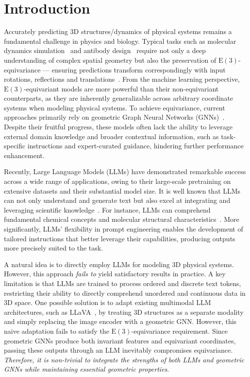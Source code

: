\section{Introduction}

Accurately predicting 3D structures/dynamics of physical systems remains a fundamental challenge in physics and biology. Typical tasks such as molecular dynamics simulation~\citep{hollingsworth2018molecular} and antibody design~\citep{tiller2015advances} require not only a deep understanding of complex spatial geometry but also the preservation of $\mathrm{E}(3)$-equivariance --- ensuring predictions transform correspondingly with input rotations, reflections and translations~\citep{batzner20223, huang2022equivariant}. From the machine learning perspective, $\mathrm{E}(3)$-equivariant models are more powerful than their non-equivariant counterparts, as they are inherently generalizable across arbitrary coordinate systems when modeling physical systems. To achieve equivariance, current approaches primarily rely on geometric Graph Neural Networks (GNNs)~\citep{wu2024equivariant, kong2022conditional}. Despite their fruitful progress, these models often lack the ability to leverage external domain knowledge and broader contextual information, such as task-specific instructions and expert-curated guidance, hindering further performance enhancement.

Recently, Large Language Models (LLMs) have demonstrated remarkable success across a wide range of applications, owing to their large-scale pretraining on extensive datasets and their substantial model size. It is well known that LLMs can not only understand and generate text but also excel at integrating and leveraging scientific knowledge~\citep{liu2025integrating, jablonka2024leveraging, wang2023scibench}. For instance, LLMs can comprehend fundamental chemical concepts and molecular structural characteristics~\citep{guo2023can}. More significantly, LLMs' flexibility in prompt engineering enables the development of tailored instructions that better leverage their capabilities, producing outputs more precisely suited to the task.

A natural idea is to directly employ LLMs for modeling 3D physical systems. However, this approach \emph{fails to} yield satisfactory results in practice. A key limitation is that LLMs are trained to process ordered and discrete text tokens, restricting their ability to directly comprehend unordered and continuous data in 3D space. One possible solution is to adapt existing multimodal LLM architectures, such as LLaVA~\citep{liu2024visual}, by treating 3D structures as a separate modality and simply replacing the image encoder with a geometric GNN. However, this naive adaptation fails to satisfy the $\mathrm{E}(3)$-equivariance requirement. Since geometric GNNs produce both invariant features and equivariant coordinates, passing these outputs through an LLM inevitably compromises equivariance. \emph{Therefore, it is non-trivial to integrate the strengths of both LLMs and geometric GNNs while maintaining essential geometric properties}.

